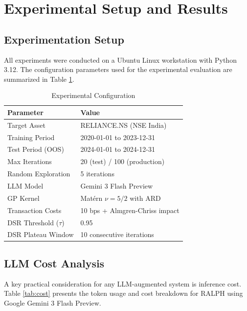\documentclass[conference]{IEEEtran}
\begin{document}
\section{Experimental Setup and Results}
\label{sec:results}

\subsection{Experimentation Setup}

All experiments were conducted on a Ubuntu Linux workstation with Python 3.12. The configuration parameters used for the experimental evaluation are summarized in Table \ref{tab:config}.

\begin{table}[h!]
\centering
\caption{Experimental Configuration}
\label{tab:config}
\begin{tabular}{@{}ll@{}}
\toprule
\textbf{Parameter} & \textbf{Value} \\
\midrule
Target Asset & RELIANCE.NS (NSE India) \\
Training Period & 2020-01-01 to 2023-12-31 \\
Test Period (OOS) & 2024-01-01 to 2024-12-31 \\
Max Iterations & 20 (test) / 100 (production) \\
Random Exploration & 5 iterations \\
LLM Model & Gemini 3 Flash Preview \\
GP Kernel & Mat\'{e}rn $\nu = 5/2$ with ARD \\
Transaction Costs & 10 bps + Almgren-Chriss impact \\
DSR Threshold ($\tau$) & 0.95 \\
DSR Plateau Window & 10 consecutive iterations \\
\bottomrule
\end{tabular}
\end{table}

\subsection{LLM Cost Analysis}

A key practical consideration for any LLM-augmented system is inference cost. Table \ref{tab:cost} presents the token usage and cost breakdown for RALPH using Google Gemini 3 Flash Preview.
\end{document}
